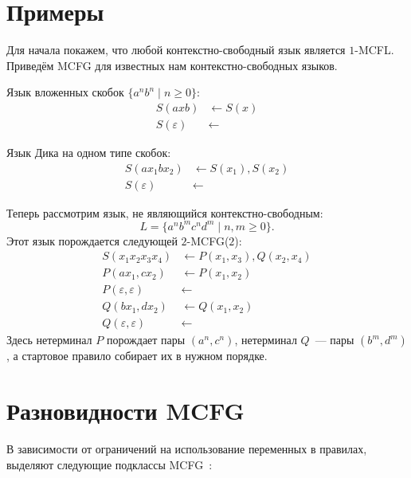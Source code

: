 \section{Примеры}

Для начала покажем, что любой контекстно-свободный язык является $1$-MCFL.
Приведём MCFG для известных нам контекстно-свободных языков.

\begin{example}
    Язык вложенных скобок $\{a^n b^n \mid n \ge 0\}$:
    \begin{align}
        S(axb) &\leftarrow S(x) \nonumber \\
        S(\varepsilon) &\leftarrow \nonumber
    \end{align}
\end{example}

\begin{example}
    Язык Дика на одном типе скобок:
    \begin{align}
        S(ax_1bx_2) &\leftarrow S(x_1), S(x_2) \nonumber \\
        S(\varepsilon) &\leftarrow \nonumber
    \end{align}
\end{example}

Теперь рассмотрим язык, не являющийся контекстно-свободным:
\[
L = \{a^n b^m c^n d^m \mid n, m \ge 0\}.
\]
Этот язык порождается следующей $2$-MCFG($2$):
\begin{align*}
    S(x_1 x_2 x_3 x_4) &\leftarrow P(x_1,x_3), Q(x_2,x_4) \\
    P(ax_1, cx_2) &\leftarrow P(x_1,x_2) \\
    P(\varepsilon,\varepsilon) &\leftarrow \\
    Q(bx_1, dx_2) &\leftarrow Q(x_1,x_2) \\
    Q(\varepsilon,\varepsilon) &\leftarrow
\end{align*}
Здесь нетерминал $P$ порождает пары $(a^n, c^n)$, нетерминал $Q$~--- пары $(b^m, d^m)$, а стартовое правило собирает их в нужном порядке.

\section{Разновидности MCFG}

В зависимости от ограничений на использование переменных в правилах, выделяют следующие подклассы MCFG~:

